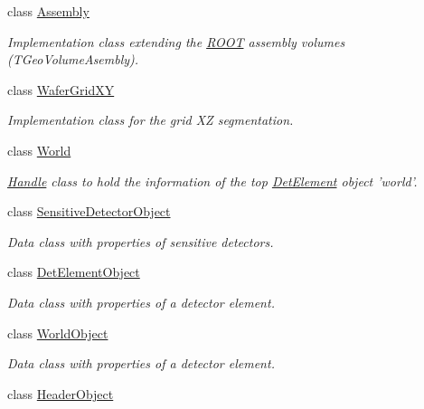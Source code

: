 \begin{DoxyCompactItemize}
class \hyperlink{class_d_d4hep_1_1_geometry_1_1_assembly}{Assembly}
\begin{DoxyCompactList}\small\item\em Implementation class extending the \hyperlink{namespace_r_o_o_t}{ROOT} assembly volumes (TGeoVolumeAsembly). \item\end{DoxyCompactList}\item 
class \hyperlink{class_d_d4hep_1_1_geometry_1_1_wafer_grid_x_y}{WaferGridXY}
\begin{DoxyCompactList}\small\item\em Implementation class for the grid XZ segmentation. \item\end{DoxyCompactList}\item 
class \hyperlink{class_d_d4hep_1_1_geometry_1_1_world}{World}
\begin{DoxyCompactList}\small\item\em \hyperlink{class_d_d4hep_1_1_handle}{Handle} class to hold the information of the top \hyperlink{class_d_d4hep_1_1_geometry_1_1_det_element}{DetElement} object 'world'. \item\end{DoxyCompactList}\item 
class \hyperlink{class_d_d4hep_1_1_geometry_1_1_sensitive_detector_object}{SensitiveDetectorObject}
\begin{DoxyCompactList}\small\item\em Data class with properties of sensitive detectors. \item\end{DoxyCompactList}\item 
class \hyperlink{class_d_d4hep_1_1_geometry_1_1_det_element_object}{DetElementObject}
\begin{DoxyCompactList}\small\item\em Data class with properties of a detector element. \item\end{DoxyCompactList}\item 
class \hyperlink{class_d_d4hep_1_1_geometry_1_1_world_object}{WorldObject}
\begin{DoxyCompactList}\small\item\em Data class with properties of a detector element. \item\end{DoxyCompactList}\item 
class \hyperlink{class_d_d4hep_1_1_geometry_1_1_header_object}{HeaderObject}

\end{DoxyCompactItemize}
